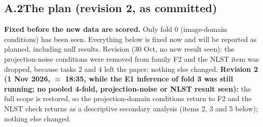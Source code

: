 \subsection*{A.2\quad The plan (revision 2, as committed)}
\textbf{Fixed before the new data are scored.}
Only fold 0 (image-domain conditions) has been seen. Everything below is fixed now and will be reported as planned, including
null results. Revision (30 Oct, no new result seen): the projection-noise conditions were removed from family F2 and the NLST
item was dropped, because tasks 2 and 4 left the paper; nothing else changed. \textbf{Revision 2 (1 Nov 2026, $\approx$ 18:35,
while the E1 inference of fold 3 was still running; no pooled 4-fold, projection-noise or NLST result seen):} the full scope is
restored, so the projection-domain conditions return to F2 and the NLST check returns as a descriptive secondary analysis
(items 2, 3 and 5 below); nothing else changed.

